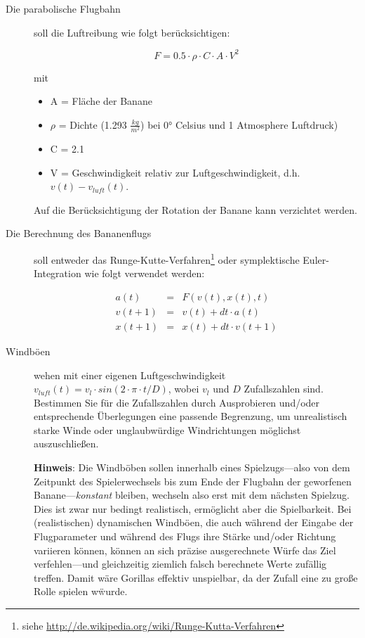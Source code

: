 \begin{description}
\item[Die parabolische Flugbahn] soll die Luftreibung wie folgt ber\"ucksichtigen:

\begin{equation*}
F = 0.5 \cdot \rho \cdot C \cdot A \cdot V^2
\end{equation*}

mit 

\begin{itemize}
\item A = Fläche der Banane 
\item $\rho$ = Dichte (1.293 $\frac{kg}{m^2}$) bei 0° Celsius und 1 Atmosphere Luftdruck) 
\item C = 2.1 
\item V = Geschwindigkeit relativ zur Luftgeschwindigkeit, d.h. $v(t) - v_{luft}(t)$.
\end{itemize}

Auf die Ber\"ucksichtigung der Rotation der Banane kann verzichtet werden.

\item[Die Berechnung des Bananenflugs] soll entweder das Runge-Kutte-Verfahren\footnote{siehe \url{http://de.wikipedia.org/wiki/Runge-Kutta-Verfahren}}
oder symplektische Euler-Integration wie folgt verwendet werden: 

\begin{eqnarray*}
a(t) & = & F(v(t), x(t), t)\\
v(t+1) &=& v(t) + dt \cdot a(t)\\
x(t+1) &=& x(t) + dt \cdot v(t+1)
\end{eqnarray*}


\item[Windb\"oen] wehen mit einer eigenen Luftgeschwindigkeit 
 $v_{luft}(t) = v_l \cdot sin(2 \cdot \pi \cdot t / D)$, wobei $v_l$ und $D$ Zufallszahlen sind. Bestimmen Sie f\"ur die Zufallszahlen durch Ausprobieren
 und/oder entsprechende \"Uberlegungen eine passende Begrenzung, um unrealistisch starke Winde oder unglaubw\"urdige Windrichtungen m\"oglichst
 auszuschlie\ss{}en. 

\textbf{Hinweis}: Die Windb\"oben sollen innerhalb eines Spielzugs---also von dem Zeitpunkt des Spielerwechsels bis zum Ende der Flugbahn der geworfenen
Banane---\emph{konstant} bleiben, wechseln also erst mit dem n\"achsten Spielzug. Dies ist zwar nur bedingt realistisch, erm\"oglicht aber die \glqq{}Spielbarkeit\grqq{}.
Bei (realistischen) dynamischen Windb\"oen, die auch w\"ahrend der Eingabe der Flugparameter und w\"ahrend des Flugs ihre St\"arke und/oder Richtung
variieren k\"onnen, k\"onnen an sich pr\"azise ausgerechnete W\"urfe das Ziel verfehlen---und gleichzeitig ziemlich falsch berechnete Werte \glqq{}zuf\"allig
treffen\grqq{}. Damit w\"are Gorillas effektiv unspielbar, da der Zufall eine zu gro\ss{}e Rolle spielen w\"wurde.
\end{description}

